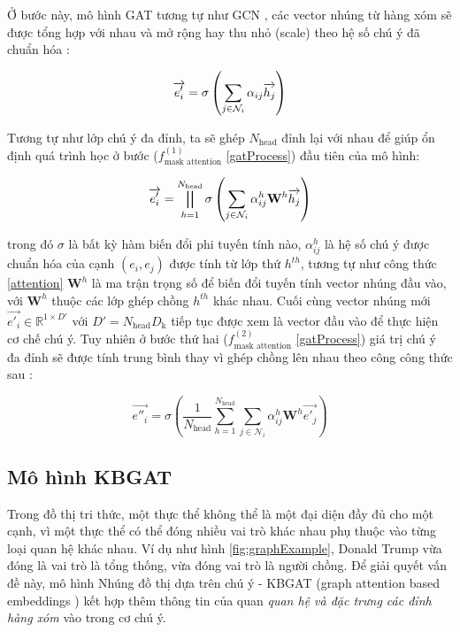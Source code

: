 Ở bước này, mô hình GAT tương tự như GCN \cite{kipf2016semi}, các vector nhúng từ hàng xóm sẽ được tổng hợp với nhau và mở rộng hay thu nhỏ (scale) theo hệ số chú ý đã chuẩn hóa :

\begin{equation}
\label{scaleAttentionCoef}
\centering
{\overrightarrow{e'_i}}={\sigma\left(\sum_{j\in \mathcal{N}_i} {\alpha_{ij} \overrightarrow{h_j} }\right)}
\end{equation}

Tương tự như lớp chú ý đa đỉnh, ta sẽ ghép $N_{\text{head}}$ đỉnh lại với nhau để giúp ổn định quá trình học ở bước ($f_{\text{mask attention}}^{(1)}$ \ref{gatProcess}) đầu tiên của mô hình:

\begin{equation}
\label{multiHeadAttention}
{\overrightarrow{e'_i}}={\bigparallel_{h=1}^{N_{\text{head}}}\sigma\left(\sum_{j\in \mathcal{N}_i}\alpha_{ij}^{h} \mathbf{W}^{h} \overrightarrow{h_{j}} \right)}
\end{equation}

trong đó $\sigma$ là bất kỳ hàm biến đổi phi tuyến tính nào, $\alpha_{ij}^h$ là hệ số chú ý được chuẩn hóa của cạnh $(e_i, e_j)$ được tính từ lớp thứ $h^{th}$, tương tự như công thức \ref{attention} $\mathbf{W}^h$ là ma trận trọng số để biến đổi tuyến tính vector nhúng đầu vào, với $\mathbf{W}^h$ thuộc các lớp ghép chồng $h^{th}$ khác nhau. Cuối cùng vector nhúng mới $\overrightarrow{e'_i} \in \mathbb{R}^{1 \times D'}$ với $D' = N_{\text{head}} D_{\text{k}}$ tiếp tục được xem là vector đầu vào để thực hiện cơ chế chú ý. Tuy nhiên ở bước thứ hai ($f_{\text{mask attention}}^{(2)}$ \ref{gatProcess}) giá trị chú ý đa đỉnh sẽ được tính trung bình thay vì ghép chồng lên nhau theo công công thức sau :

\begin{equation}
\label{multiHeadConcat}
{\overrightarrow{e''_i}}={\sigma\left(\frac{1}{N_{\text{head}}} \sum_{h=1}^{N_{\text{head}}}\sum_{j\in \mathcal{N}_i}\alpha_{ij}^{h} \mathbf{W}^{h} \overrightarrow{e'_{j}} \right)}
\end{equation}

\subsection{Mô hình KBGAT}

Trong đồ thị tri thức, một thực thể không thể là một đại diện đầy đủ cho một cạnh, vì một thực thể có thể đóng nhiều vai trò khác nhau phụ thuộc vào từng loại quan hệ khác nhau. Ví dụ như hình \ref{fig:graphExample}, Donald Trump vừa đóng là vai trò là tổng thống, vừa đóng vai trò là người chồng. Để giải quyết vấn đề này, mô hình Nhúng đồ thị dựa trên chú ý - KBGAT (graph attention based embeddings \cite{nathani2019learning}) kết hợp thêm thông tin của quan \textit{quan hệ và đặc trưng các đỉnh hàng xóm} vào trong cơ chú ý.

